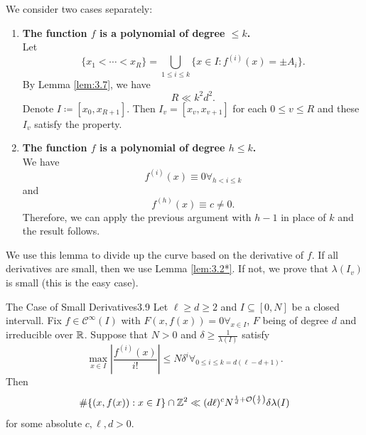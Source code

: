 \documentclass{Vorlesungstemplate_English} %
\begin{document}
\begin{pf}
  We consider two cases separately:
  \begin{enumerate}[(1)]
    \item{\textbf{The function $f$ is  a polynomial of degree $\leq k$.} \\
    Let \[\{ x_1 < \cdots < x_R\} = \bigcup_{1 \leq i \leq k}\{ x \in I: f^{(i)}(x) = \pm A_i\}.\]
    By Lemma \ref{lem:3.7}, we have
    \[ R \ll k^2d^2.\]
    Denote $I \coloneq [x_0, x_{R+1}]$. Then $I_v = [x_v, x_{v+1}] $ for each $0 \leq v \leq R$ and these $I_v$ satisfy the property.}
    \item{\textbf{The function $f$ is a polynomial of degree $h \leq k$.} \\
    We have
    \[ f^{(i)}(x) \equiv 0 \forall_{h < i \leq k}\]
    and
    \[ f^{(h)}(x) \equiv c \neq 0.\]
    Therefore, we can apply the previous argument with $h-1$ in place of $k$ and the result follows. \qedhere}
  \end{enumerate}
\end{pf}
We use this lemma to divide up the curve based on the derivative of $f$. If all derivatives are small, then we use Lemma \ref{lem:3.2*}. If not, we prove that $\lambda(I_v)$ is small (this is the easy case).
\begin{lemma}{The Case of Small Derivatives}{3.9}
  Let $\ell \geq d \geq 2$ and $I \subseteq [0,N]$ be a closed intervall. Fix $f \in \mathcal{C}^{\infty}(I)$ with $F(x,f(x)) = 0 \forall_{x \in I}$, $F$ being of degree $d$ and irreducible over $\mathbb{R}$. Suppose that $N > 0$ and $\delta \geq \frac{1}{\lambda(I)}$ satisfy
  \[ \max_{x \in I}\left| \frac{f^{(i)}(x)}{i!}\right| \leq N\delta^i \forall_{0 \leq i \leq k = d(\ell-d+1)}.\]
  Then
  \[ \#\{ (x,f(x)): x \in I\} \cap \mathbb{Z}^2 \ll (d\ell)^cN^{\frac{1}{d} + \mathcal{O}\left(\frac{1}{\ell}\right)}\delta\lambda(I)\]
  for some absolute $c, \ell, d > 0$.
\end{lemma}
\end{document}
